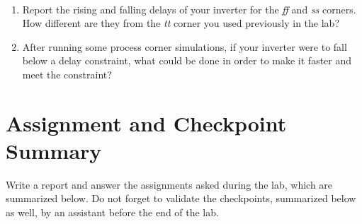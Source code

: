 \begin{exercise}\ \label{ex6}
	\vspace{-5mm}
	\begin{enumerate}
			\item Report the rising and falling delays of your inverter for the \textit{ff} and \textit{ss} corners. How different are they from the \textit{tt} corner you used previously in the lab?
		\item After running some process corner simulations, if your inverter were to fall below a delay constraint, what could be done in order to make it faster and meet the constraint?
	\end{enumerate}
	\vspace{-5mm}
\end{exercise}


\section{Assignment and Checkpoint Summary}
Write a report and answer the assignments asked during the lab, which are summarized below. Do not forget to validate the checkpoints, summarized below as well, by an assistant before the end of the lab.


